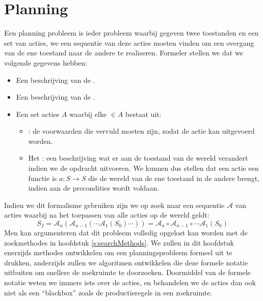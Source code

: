 \chapter{Planning}
\label{s:planning}
Een planning probleem is ieder probleem waarbij gegeven twee toestanden en een set van acties, we een sequentie van deze acties moeten vinden om een overgang van de ene toestand naar de andere te realiseren. Formeler stellen we dat we volgende gegevens hebben:
\begin{itemize}
 \item Een beschrijving van de .
 \item Een beschrijving van de .
 \item Een set acties $A$ waarbij elke  $\in A$ bestaat uit:
 \begin{itemize}
  \item {}: de voorwaarden die vervuld moeten zijn, zodat de actie kan uitgevoerd worden.
  \item Het : een beschrijving wat er aan de toestand van de wereld verandert indien we de opdracht uitvoeren.
 We kunnen dus stellen dat een actie een functie is $a:S\rightarrow S$ die de wereld van de ene toestand in de andere brengt, indien aan de precondities wordt voldaan.
 \end{itemize}
\end{itemize}
Indien we dit formalisme gebruiken zijn we op zoek naar een sequentie $\mathcal{A}$ van acties waarbij na het toepassen van alle acties op de wereld geldt:
\begin{equation}
S_f=\mathcal{A}_n\left(\mathcal{A}_{n-1}\left(\cdots \mathcal{A}_1\left(S_0\right)\cdots\right)\right)=\mathcal{A}_n\circ\mathcal{A}_{n-1}\circ\cdots\mathcal{A}_1\left(S_0\right)
\end{equation}
Men kan argumenteren dat dit probleem volledig opgelost kan worden met de zoekmethodes in hoofdstuk \ref{s:searchMethods}. We zullen in dit hoofdstuk enerzijds methodes ontwikkelen om een planningsprobleem formeel uit te drukken, anderzijds zullen we algoritmen ontwikkelen die deze formele notatie uitbuiten om snellere de zoekruimte te doorzoeken. Doormiddel van de formele notatie weten we immers iets over de acties, en behandelen we de acties dan ook niet als een ``blackbox'' zoals de productieregels in een zoekruimte.
